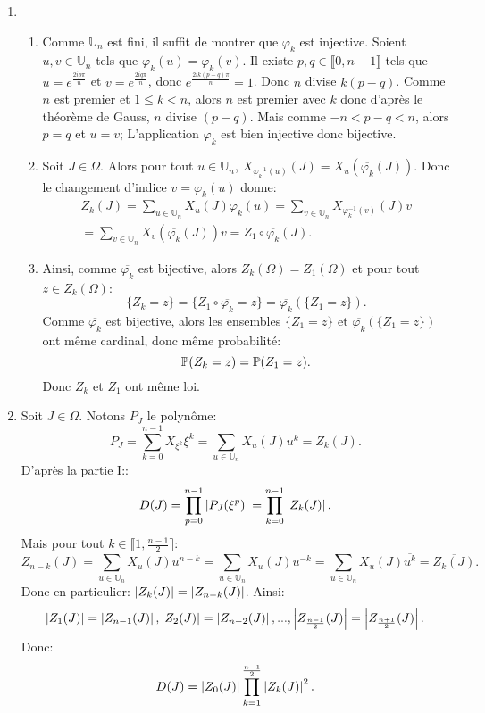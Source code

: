 \begin{enumerate}
\item \begin{enumerate}
           \item Comme $\mathbb{U}_{n}$ est fini, il suffit de montrer que $\varphi_{k}$ est injective. Soient $u,v\in \mathbb{U}_{n}$ tels que $\varphi_{k}(u) = \varphi_{k}(v)$. Il existe $p,q\in \llbracket 0, n-1\rrbracket$ tels que $u = e^{\frac{2ip\pi}{n}}$ et $v = e^{\frac{2iq\pi}{n}}$, donc $e^{\frac{2ik(p-q)\pi}{n}} = 1$. Donc $n$ divise $k(p-q)$. Comme $n$ est premier et $1\leq k < n$, alors $n$ est premier avec $k$ donc d'après le théorème de Gauss, $n$ divise $(p-q)$. Mais comme $-n < p-q < n$, alors $p = q$ et $u = v$; L'application $\varphi_{k}$ est bien injective donc bijective.
           \item Soit $J\in \Omega$. Alors pour tout $u\in \mathbb{U}_{n}$, $X_{\varphi_{k}^{-1}(u)}(J) = X_{u}(\overline{\varphi_{k}}(J))$. Donc le changement d'indice $v = \varphi_{k}(u)$ donne:
\begin{multline*}
  Z_{k}(J) = \sum_{u\in \mathbb{U}_{n}}X_{u}(J)\varphi_{k}(u) 
           = \sum_{v\in \mathbb{U}_{n}}X_{\varphi_{k}^{-1}(v)}(J)v \\
           = \sum_{v\in \mathbb{U}_{n}}X_{v}(\overline{\varphi_{k}}(J))v
           = Z_{1}\circ \overline{\varphi_{k}}(J).
\end{multline*}
           \item Ainsi, comme $\overline{\varphi_{k}}$ est bijective, alors $Z_{k}(\Omega) = Z_{1}(\Omega)$ et pour tout $z\in Z_{k}(\Omega)$:
           \[ \{Z_{k} = z\} = \{Z_{1} \circ  \overline{\varphi_{k}} = z\} = \overline{\varphi_{k}}(\{ Z_{1} = z \}).\]
           Comme $\overline{\varphi_{k}}$ est bijective, alors les ensembles $\{ Z_{1} = z \}$ et $\overline{\varphi_{k}}(\{ Z_{1} = z\})$ ont même cardinal, donc même probabilité:
           \[ \mathbb{P}(Z_{k} = z) = \mathbb{P}(Z_{1} = z).\]
           Donc $Z_{k}$ et $Z_{1}$ ont même loi.
          \end{enumerate}
          
\item Soit $J\in \Omega$. Notons $P_{J}$ le polynôme:
\[ P_{J} = \sum_{k=0}^{n-1}X_{\xi^{k}}\xi^{k} = \sum_{u\in \mathbb{U}_{n}} X_{u}(J)u^{k} = Z_{k}(J).\]
D'après la partie I::
\[ D(J) = \prod_{p=0}^{n-1}\left\vert P_{J}(\xi^{p})\right\vert = \prod_{k=0}^{n-1}\left\vert Z_{k}(J)\right\vert.\]
Mais pour tout $k\in \llbracket 1, \frac{n-1}{2}\rrbracket$:
\[ Z_{n-k}(J) = \sum_{u\in \mathbb{U}_{n}}X_{u}(J)u^{n-k} = \sum_{u\in \mathbb{U}_{n}}X_{u}(J)u^{-k} = \sum_{u\in \mathbb{U}_{n}}X_{u}(J)\overline{u^{k}} = \overline{Z_{k}(J)}.\]
Donc en particulier: $\left\vert Z_{k}(J)\right\vert = \left\vert Z_{n-k}(J)\right\vert$. Ainsi:
\[ \left\vert Z_{1}(J)\right\vert = \left\vert Z_{n-1}(J)\right\vert, \left\vert Z_{2}(J)\right\vert = \left\vert Z_{n-2}(J)\right\vert, ..., \left\vert Z_{\frac{n-1}{2}}(J)\right\vert = \left\vert Z_{\frac{n+1}{2}}(J)\right\vert.\]
Donc:
\[ D(J) = \left\vert Z_{0}(J)\right\vert \prod_{k=1}^{\frac{n-1}{2}}\left\vert Z_{k}(J)\right\vert^{2}.\]


\end{enumerate}
